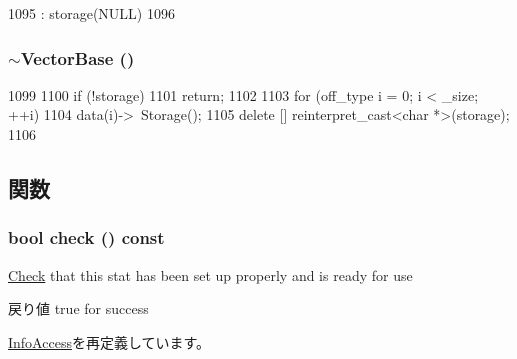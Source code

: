 \begin{DoxyCode}
1095         : storage(NULL)
1096     {}
\end{DoxyCode}
\hypertarget{classStats_1_1VectorBase_a12114a53f6c0a8f17deeb0dc6a208b67}{
\subsubsection[{$\sim$VectorBase}]{\setlength{\rightskip}{0pt plus 5cm}$\sim${\bf VectorBase} ()}}
\label{classStats_1_1VectorBase_a12114a53f6c0a8f17deeb0dc6a208b67}



\begin{DoxyCode}
1099     {
1100         if (!storage)
1101             return;
1102 
1103         for (off_type i = 0; i < _size; ++i)
1104             data(i)->~Storage();
1105         delete [] reinterpret_cast<char *>(storage);
1106     }
\end{DoxyCode}


\subsection{関数}
\hypertarget{classStats_1_1VectorBase_a6ecddb2c44556b7acbc1723a968ff8bb}{
\subsubsection[{check}]{\setlength{\rightskip}{0pt plus 5cm}bool check () const}}
\label{classStats_1_1VectorBase_a6ecddb2c44556b7acbc1723a968ff8bb}
\hyperlink{classCheck}{Check} that this stat has been set up properly and is ready for use \begin{DoxyReturn}{戻り値}
true for success 
\end{DoxyReturn}


\hyperlink{classStats_1_1InfoAccess_a6ecddb2c44556b7acbc1723a968ff8bb}{InfoAccess}を再定義しています。


